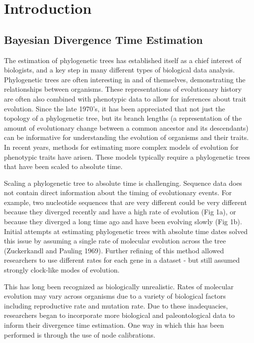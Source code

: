 \documentclass[]{article}
\begin{document}
\section{Introduction}
\subsection{Bayesian Divergence Time Estimation}

The estimation of phylogenetic trees has established itself as a chief interest of biologists, and a key step in many different types of biological data analysis.
Phylogenetic trees are often interesting in and of themselves, demonstrating the relationships between organisms.
These representations of evolutionary history are often also combined with phenotypic data to allow for inferences about trait evolution.
Since the late 1970's, it has been appreciated that not just the topology of a phylogenetic tree, but its branch lengths (a representation of the amount of evolutionary change between a common ancestor and its descendants) can be informative for understanding the evolution of organisms and their traits. 
In recent years, methods for estimating more complex models of evolution for phenotypic traits have arisen.
These models  typically require a phylogenetic trees that have been scaled to absolute time. \par
Scaling a phylogenetic tree to absolute time is challenging.
Sequence data does not contain direct information about the timing of evolutionary events.
For example, two nucleotide sequences that are very different could be very different because they diverged recently and have a high rate of evolution (Fig 1a), or because they diverged a long time ago and have been evolving slowly (Fig 1b). 
Initial attempts at estimating phylogenetic trees with absolute time dates solved this issue by assuming a single rate of molecular evolution across the tree (Zuckerkandl and Pauling 1969). 
Further refining of this method allowed researchers to use different rates for each gene in a dataset - but still assumed strongly clock-like modes of evolution. \par
This has long been recognized as biologically unrealistic. 
Rates of molecular evolution may vary across organisms due to a variety of biological factors including reproductive rate and mutation rate.
Due to these inadequacies, researchers began to incorporate more biological and paleontological data to inform their divergence time estimation. 
One way in which this has been performed is through the use of node calibrations.
\end{document}
